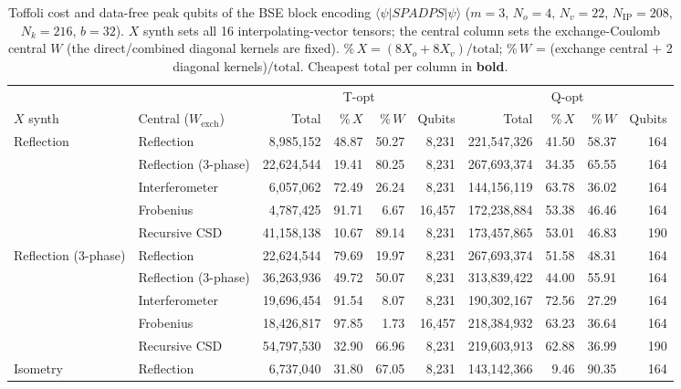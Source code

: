 \begin{table}[htbp]
  \centering
  \caption{Toffoli cost and data-free peak qubits of the BSE block encoding
           $\langle\psi| S P A D P S |\psi\rangle$ ($m=3$, $N_o=4$, $N_v=22$, $N_\mathrm{IP}=208$, $N_k=216$, $b=32$).
           $X$ synth sets all 16 interpolating-vector tensors; the central column sets the
           exchange-Coulomb central $W$ (the direct/combined diagonal kernels are fixed).
           \%\,$X=(8X_o+8X_v)/\text{total}$; \%\,$W$ = (exchange central $+$ 2 diagonal kernels)$/\text{total}$.
           Cheapest total per column in \textbf{bold}.}
  \setlength{\tabcolsep}{4pt}
  \begin{tabular}{llrrrrrrrr}
    \toprule
    & & \multicolumn{4}{c}{T-opt} & \multicolumn{4}{c}{Q-opt} \\
    \cmidrule(lr){3-6}\cmidrule(lr){7-10}
    $X$ synth & Central ($W_{\mathrm{exch}}$) & Total & \%\,$X$ & \%\,$W$ & Qubits & Total & \%\,$X$ & \%\,$W$ & Qubits \\
    \midrule
    Reflection & Reflection & 8{,}985{,}152 & 48.87 & 50.27 & 8{,}231 & 221{,}547{,}326 & 41.50 & 58.37 & 164 \\
     & Reflection (3-phase) & 22{,}624{,}544 & 19.41 & 80.25 & 8{,}231 & 267{,}693{,}374 & 34.35 & 65.55 & 164 \\
     & Interferometer & 6{,}057{,}062 & 72.49 & 26.24 & 8{,}231 & 144{,}156{,}119 & 63.78 & 36.02 & 164 \\
     & Frobenius & 4{,}787{,}425 & 91.71 & 6.67 & 16{,}457 & 172{,}238{,}884 & 53.38 & 46.46 & 164 \\
     & Recursive CSD & 41{,}158{,}138 & 10.67 & 89.14 & 8{,}231 & 173{,}457{,}865 & 53.01 & 46.83 & 190 \\
    \midrule
    Reflection (3-phase) & Reflection & 22{,}624{,}544 & 79.69 & 19.97 & 8{,}231 & 267{,}693{,}374 & 51.58 & 48.31 & 164 \\
     & Reflection (3-phase) & 36{,}263{,}936 & 49.72 & 50.07 & 8{,}231 & 313{,}839{,}422 & 44.00 & 55.91 & 164 \\
     & Interferometer & 19{,}696{,}454 & 91.54 & 8.07 & 8{,}231 & 190{,}302{,}167 & 72.56 & 27.29 & 164 \\
     & Frobenius & 18{,}426{,}817 & 97.85 & 1.73 & 16{,}457 & 218{,}384{,}932 & 63.23 & 36.64 & 164 \\
     & Recursive CSD & 54{,}797{,}530 & 32.90 & 66.96 & 8{,}231 & 219{,}603{,}913 & 62.88 & 36.99 & 190 \\
    \midrule
    Isometry & Reflection & 6{,}737{,}040 & 31.80 & 67.05 & 8{,}231 & 143{,}142{,}366 & 9.46 & 90.35 & 164 \\

\end{tabular}
\end{table}
